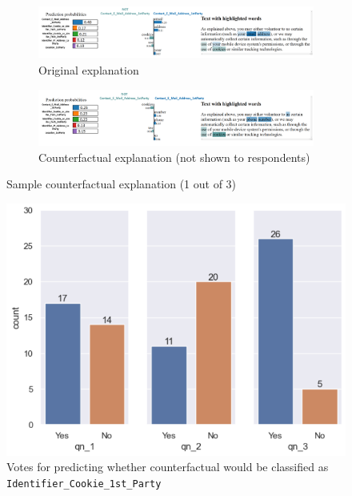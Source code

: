 \begin{figure}[!ht]
  \begin{subfigure}[b]{1\textwidth}
    \centering
    \includegraphics[width=1\linewidth]{figures/explanations_visualisations/counterfactual/3.3.png}
    \caption{Original explanation}
  \end{subfigure}
  \hfill
  \begin{subfigure}[b]{1\textwidth}
    \centering
    \includegraphics[width=1\linewidth]{figures/explanations_visualisations/counterfactual/3_3_counterfactual.png}
    \caption{Counterfactual explanation (not shown to respondents)}
    \label{fig:part3_counterfactual_1}
  \end{subfigure}
  \caption{Sample counterfactual explanation (1 out of 3)}
  \label{fig:part3_counterfactuals_example}
\end{figure}

\begin{figure}[!ht]
    \centering
    \includegraphics[width=1\linewidth]{figures/part_3_counterfactual.png}
    \caption{Votes for predicting whether counterfactual would be classified as \texttt{Identifier\_Cookie\_1st\_Party}}
    \label{fig:part3_counterfactual}
\end{figure}

